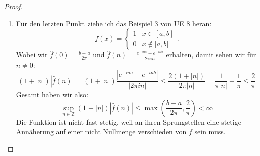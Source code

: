 \documentclass[11pt]{article}
\begin{document}
\begin{proof}
\begin{enumerate}[label = (\alph*)]
            \item Für den letzten Punkt ziehe ich das Beispiel 3 von UE 8 heran:
            $$
            f(x)=\left\{\begin{array}{ll}
                            1 & x \in[a, b] \\
                            0 & x \notin \mid a, b]
            \end{array} .\right.
            $$
            Wobei wir $\hat{f}(0)=\frac{b-a}{2\pi}$ und $\hat{f}(n)=\frac{e^{-ina}-e^{-inb}}{2\pi in}$
            erhalten, damit sehen wir für $n\neq 0$:
            $$(1+|n|)|\hat{f}(n)|=(1+|n|)\frac{|e^{-ina}-e^{-inb}|}{|2\pi in|}\leq
            \frac{2(1+|n|)}{2\pi |n|}=\frac{1}{\pi |n|}+ \frac{1}{\pi}\leq \frac{2}{\pi}$$
            Gesamt haben wir also:
            $$\sup _{n \in \mathbb{Z}}(1+|n|)|\hat{f}(n)|\leq \max\left(\frac{b-a}{2\pi},\frac{2}{\pi}
            \right)<\infty$$
            Die Funktion ist nicht fast stetig, weil an ihren Sprungstellen eine stetige Annäherung auf
            einer nicht Nullmenge verschieden von $f$ sein muss.
        \end{enumerate}
    \end{proof}
\end{document}
